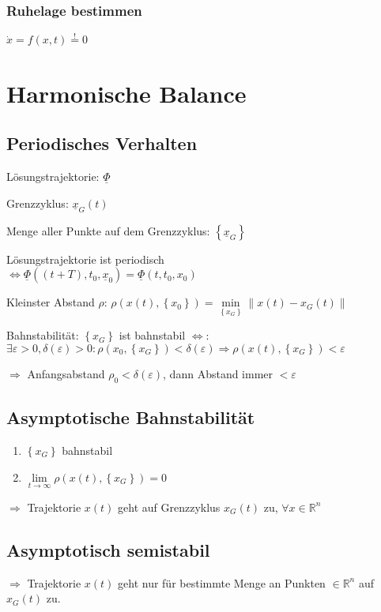 \documentclass[6pt,a4paper,fleqn]{scrartcl}
\begin{document}
\begin{multicols*}{4}
\subsubsection*{Ruhelage bestimmen}
$\dot x = f(x,t) \overset{!}{=} 0$


\section{Harmonische Balance}

\subsection{Periodisches Verhalten}

Lösungstrajektorie: $\underline{\Phi}$ 

Grenzzyklus: $\underline{x}_G(t)$

Menge aller Punkte auf dem Grenzzyklus: $\left\{ \underline{x}_G \right\}$

Lösungstrajektorie ist periodisch\\ $ \Leftrightarrow \underline{\Phi}\left( (t+T), t_0, \underline{x}_0 \right) = \underline{\Phi}\left( t,t_0,x_0 \right)$

Kleinster Abstand $\rho$: $\rho\left( x(t), \left\{ x_0 \right\} \right) = \min\limits_{ \left\{ x_G \right\} } \|x(t) - x_G(t)\| $

Bahnstabilität: $\left\{ x_G \right\}$ ist bahnstabil $\Leftrightarrow$:
$\exists \varepsilon > 0, \delta(\varepsilon) > 0: \rho(x_0, \left\{ x_G \right\}) < \delta(\varepsilon) \Rightarrow \rho(x(t), \left\{ x_G \right\}) < \varepsilon$

$\Rightarrow$ Anfangsabstand $\rho_0 < \delta(\varepsilon)$, dann Abstand immer $< \varepsilon$

\subsection{Asymptotische Bahnstabilität}

\begin{enumerate}
  \item $\left\{ x_G \right\}$ bahnstabil
  \item $\lim\limits_{t \rightarrow \infty} \rho\left( x(t), \left\{ x_G \right\} \right) = 0 $
\end{enumerate}
$\Rightarrow$ Trajektorie $x(t)$ geht auf Grenzzyklus $x_G(t)$ zu, $\forall x \in \mathbb{R}^n$

\subsection{Asymptotisch semistabil}
$\Rightarrow$ Trajektorie $x(t)$ geht nur für bestimmte Menge an Punkten $\in \mathbb{R}^n$ auf $x_G(t)$ zu.



\end{multicols*}
\end{document}
